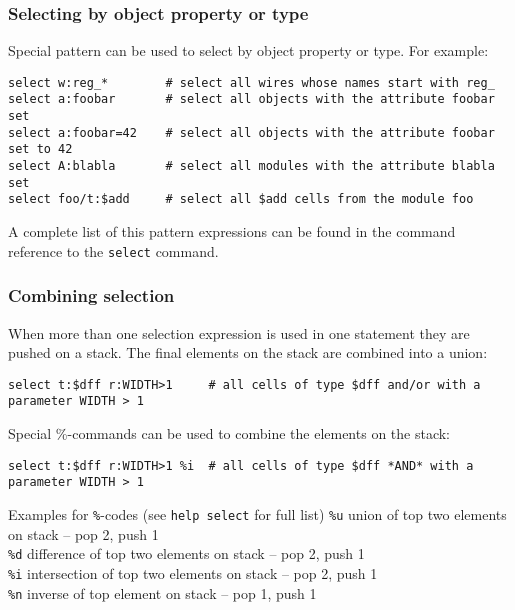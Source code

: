 \subsubsection{Selecting by object property or type}

\begin{frame}[fragile]{\subsubsecname}
Special pattern can be used to select by object property or type. For example:

\bigskip
\begin{lstlisting}[xleftmargin=0.5cm, basicstyle=\ttfamily\fontsize{8pt}{10pt}\selectfont, language=ys]
select w:reg_*        # select all wires whose names start with reg_
select a:foobar       # select all objects with the attribute foobar set
select a:foobar=42    # select all objects with the attribute foobar set to 42
select A:blabla       # select all modules with the attribute blabla set
select foo/t:$add     # select all $add cells from the module foo
\end{lstlisting}

\bigskip
A complete list of this pattern expressions can be found in the command
reference to the {\tt select} command.
\end{frame}

\subsubsection{Combining selection}

\begin{frame}[fragile]{\subsubsecname}
When more than one selection expression is used in one statement they are
pushed on a stack. The final elements on the stack are combined into a union:

\medskip
\begin{lstlisting}[xleftmargin=0.5cm, basicstyle=\ttfamily\fontsize{8pt}{10pt}\selectfont, language=ys]
select t:$dff r:WIDTH>1     # all cells of type $dff and/or with a parameter WIDTH > 1
\end{lstlisting}

\bigskip
Special \%-commands can be used to combine the elements on the stack:

\medskip
\begin{lstlisting}[xleftmargin=0.5cm, basicstyle=\ttfamily\fontsize{8pt}{10pt}\selectfont, language=ys]
select t:$dff r:WIDTH>1 %i  # all cells of type $dff *AND* with a parameter WIDTH > 1
\end{lstlisting}

\medskip
\begin{block}{Examples for {\tt \%}-codes (see {\tt help select} for full list)}
{\tt \%u} \dotfill union of top two elements on stack -- pop 2, push 1 \\
{\tt \%d} \dotfill difference of top two elements on stack -- pop 2, push 1 \\
{\tt \%i} \dotfill intersection of top two elements on stack -- pop 2, push 1 \\
{\tt \%n} \dotfill inverse of top element on stack -- pop 1, push 1 \\
\end{block}
\end{frame}

